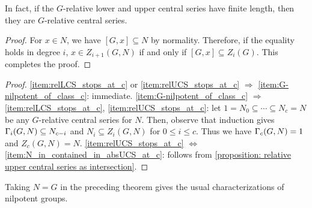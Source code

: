 In fact, if the $G$-relative lower and upper central series have finite length, then they are $G$-relative central series.


\begin{proof}
For $x\in N$, we have $[G,x]\subseteq N$ by normality. Therefore, if the equality holds in degree $i$, $x\in Z_{i+1}(G, N)$ if and only if $[G, x]\subseteq Z_i(G)$. This completes the proof.
\end{proof}


\begin{proof}
\ref{item:relLCS_stops_at_c} or \ref{item:relUCS_stops_at_c} $\Rightarrow$ \ref{item:G-nilpotent_of_class_c}: immediate.
\ref{item:G-nilpotent_of_class_c} $\Rightarrow$ \ref{item:relLCS_stops_at_c}, \ref{item:relUCS_stops_at_c}: let $1=N_0\subseteq\cdots\subseteq N_c=N$ be any $G$-relative central series for $N$. Then, observe that induction gives $\Gamma_i(G,N)\subseteq N_{c-i}$ and $N_i\subseteq Z_i(G,N)$ for $0\leq i\leq c$. Thus we have $\Gamma_c(G,N)=1$ and $Z_c(G,N)=N$.
\ref{item:relUCS_stops_at_c} $\Leftrightarrow$ \ref{item:N_in_contained_in_absUCS_at_c}: follows from \cref{proposition: relative upper central series as intersection}.
\end{proof}

Taking $N=G$ in the preceding theorem gives the usual characterizations of nilpotent groups.

